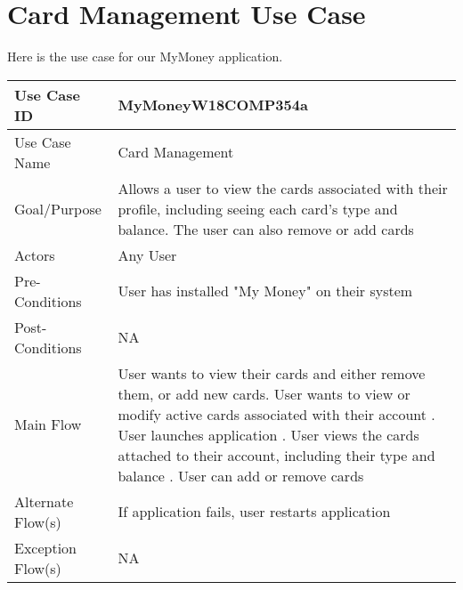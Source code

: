 \documentclass{article}
\begin{document}
\section{Card Management Use Case}
Here is the use case for our MyMoney application.

\medskip
\begin{center}
\begin{tabular}{| l | p{10cm} |}
\hline

Use Case ID  & MyMoneyW18COMP354a\\
\hline
Use Case Name  & Card Management\\
\hline
Goal/Purpose  & Allows a user to view the cards associated with their profile, including seeing each card's type and balance. The user can also remove or add cards\\
\hline
Actors  & Any User\\
\hline
Pre-Conditions &  User has installed "My Money" on their system \\
\hline
Post-Conditions & NA \\
\hline
Main Flow & User wants to view their cards and either remove them, or add new cards\newline
1.	User wants to view or modify active cards associated with their account \newline
2.  User launches application \newline
3.  User views the cards attached to their account, including their type and balance \newline
4.	User can add or remove cards\newline
\\
\hline
Alternate Flow(s) & If application fails, user restarts application

\\
\hline
Exception Flow(s) & NA \\
\hline

\end{tabular}
\end{center}
\end{document}
